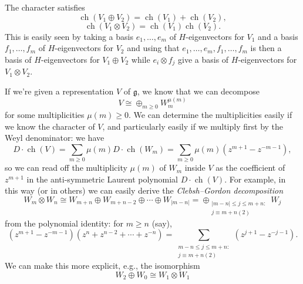 \documentclass[reqno]{amsart} 
\begin{document}
The character satisfies
\begin{equation*}
  \operatorname{ch}(V_1 \oplus V_2) = \operatorname{ch}(V_1) + \operatorname{ch}(V_2),
\end{equation*}
\begin{equation*}
  \operatorname{ch}(V_1 \otimes V_2) = \operatorname{ch}(V_1) \operatorname{ch}(V_2).
\end{equation*}
This is easily seen by taking a basis
$e_1,\dotsc,e_m$ of $H$-eigenvectors
for $V_1$
and a basis
$f_1,\dotsc,f_m$ of $H$-eigenvectors
for $V_2$
and using that $e_1,\dotsc,e_m,f_1,\dotsc,f_m$
is then a basis of $H$-eigenvectors for $V_1 \oplus V_2$
while
$e_i \otimes f_j$ give a basis of $H$-eigenvectors
for $V_1 \otimes V_2$.

If we're given a representation $V$ of $\mathfrak{g}$,
we know that we can decompose
\begin{equation*}
  V \cong  \oplus_{m \geq 0} W_m^{\mu(m)}
\end{equation*}
for some multiplicities $\mu(m) \geq 0$.
We can determine the multiplicities easily if we know the
character
of $V$,
and particularly easily if we multiply first by the Weyl
denominator:
we have
\begin{equation*}
  D \cdot \operatorname{ch}(V)
  = \sum_{m \geq 0} \mu(m) D \cdot \operatorname{ch}(W_m)
  = \sum_{m \geq 0}
  \mu(m)
  (z^{m+1} - z^{-m-1}),
\end{equation*}
so we can read off the multiplicity $\mu(m)$
of $W_m$
inside $V$
as the coefficient of $z^{m+1}$ in the anti-symmetric Laurent
polynomial
$D \cdot \operatorname{ch}(V)$.
For example, in this way (or in others) we can easily
derive the \emph{Clebsh--Gordon decomposition}
\begin{equation*}
  W_m \otimes W_n \cong
  W_{m+n} \oplus W_{m+n-2} \oplus \dotsb \oplus W_{|m-n|}
  = \oplus_{
    \substack{
      |m-n| \leq j \leq m+n :  \\
      j \equiv m+n (2)
    }
  } W_j
\end{equation*}
from the polynomial identity: for $m \geq n$ (say),
\begin{equation*}
  (z^{m+1} - z^{-m-1}) (z^n + z^{n-2} + \dotsb + z^{-n})
  =
  \sum _{\substack{
      m-n \leq j \leq m + n : \\
      j \equiv m+n(2)
    }
  }
  (z^{j + 1} - z^{-j-1}).
\end{equation*}
We can make this more explicit, e.g.,
the isomorphism
\begin{equation*}
  W_2 \oplus W_0 \cong W_1 \otimes W_1
\end{equation*}
\end{document}
